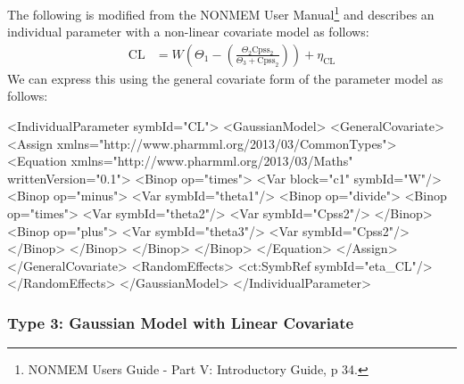 \documentclass[a4paper,10pt]{article}
\begin{document}
The following is modified from the NONMEM User Manual\footnote{NONMEM
  Users Guide - Part V: Introductory Guide, p 34.}  and describes an
individual parameter with a non-linear covariate model as follows:
%
\begin{align*}
\mathrm{CL} &= W \left(\Theta_1 -
  \left(\frac{\Theta_2 \mathrm{Cpss_2}}{\Theta_3 +
      \mathrm{Cpss}_2}\right)\right) + \eta_{\mathrm{CL}}
\end{align*}
%
We can express this using the general covariate form of the parameter model as follows: 
%
\begin{xmlcode}
<IndividualParameter symbId="CL">
    <GaussianModel>
        <GeneralCovariate>
            <Assign xmlns="http://www.pharmml.org/2013/03/CommonTypes">
                <Equation xmlns="http://www.pharmml.org/2013/03/Maths"
                    writtenVersion="0.1">
                    <Binop op="times">
                        <Var block="c1" symbId="W"/>
                        <Binop op="minus">
                            <Var symbId="theta1"/>
                            <Binop op="divide">
                                <Binop op="times">
                                    <Var symbId="theta2"/>
                                    <Var symbId="Cpss2"/>
                                </Binop>
                                <Binop op="plus">
                                    <Var symbId="theta3"/>
                                    <Var symbId="Cpss2"/>
                                </Binop>
                            </Binop>
                        </Binop>
                    </Binop>
                </Equation>
            </Assign>
        </GeneralCovariate>
        <RandomEffects>
            <ct:SymbRef symbId="eta_CL"/>
        </RandomEffects>
    </GaussianModel>
</IndividualParameter>
\end{xmlcode}


\subsubsection{Type 3: Gaussian Model with Linear Covariate}
\end{document}
